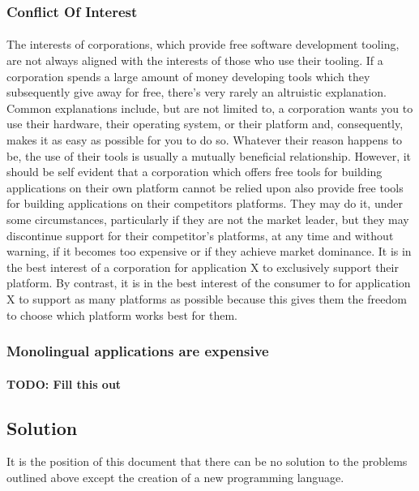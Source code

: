 \documentclass[hidelinks]{article}
\begin{document}
\subsubsection{Conflict Of Interest}\paragraph{}The interests of corporations, which provide free software development tooling, are not always aligned with the interests of those who use their tooling. If a corporation spends a large amount of money developing tools which they subsequently give away for free, there's very rarely an altruistic explanation. Common explanations include, but are not limited to, a corporation wants you to use their hardware, their operating system, or their platform and, consequently, makes it as easy as possible for you to do so. Whatever their reason happens to be, the use of their tools is usually a mutually beneficial relationship. However, it should be self evident that a corporation which offers free tools for building applications on their own platform cannot be relied upon also provide free tools for building applications on their competitors platforms. They may do it, under some circumstances, particularly if they are not the market leader, but they may discontinue support for their competitor's platforms, at any time and without warning, if it becomes too expensive or if they achieve market dominance. It is in the best interest of a corporation for application X to exclusively support their platform. By contrast, it is in the best interest of the consumer to for application X to support as many platforms as possible because this gives them the freedom to choose which platform works best for them. 
\subsubsection{Monolingual applications are expensive}\paragraph{}
\textbf{TODO: Fill this out}
\subsection{Solution}
It is the position of this document that there can be no solution to the problems outlined above except the creation of a new programming language.
\\
\end{document}

